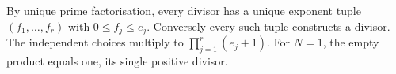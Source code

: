 By unique prime factorisation, every divisor has a unique exponent tuple $(f_1,\ldots,f_r)$ with $ 0\le f_j\le e_j $. Conversely every such tuple constructs a divisor. The independent choices multiply to $\boxed{\prod_{j=1}^r(e_j+1)}$. For $ N=1 $, the empty product equals one, its single positive divisor.
